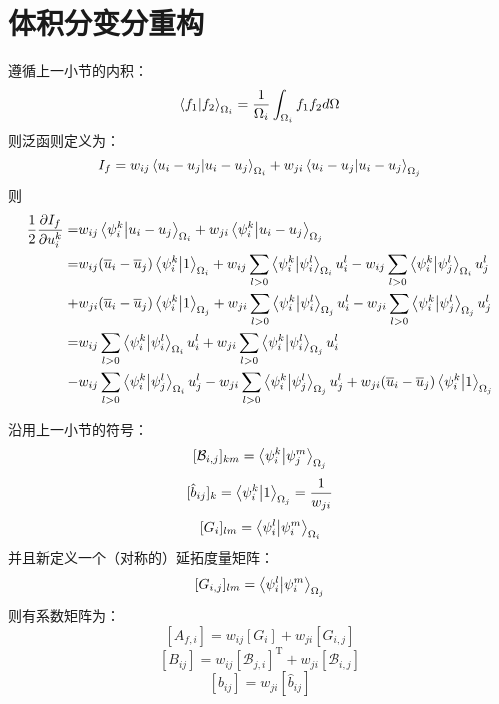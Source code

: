 \documentclass[UTF8,zihao=5]{ctexart} %
\newcommand{\trans}[0]{^\mathrm{T}}
\newcommand*{\mean}[1]{\overline{#1}}
\begin{document}
\section{体积分变分重构}

遵循上一小节的内积：
$$
    \innerproduct{f_1}{f_2}_{\Omega_i}=\frac{1}{\Omega_i}\int_{\Omega_i}{f_1f_2d\Omega}
$$
则泛函则定义为：
$$
    I_f=
    w_{ij}
    \innerproduct{u_i-u_j}{u_i-u_j}_{\Omega_i}
    +
    w_{ji}
    \innerproduct{u_i-u_j}{u_i-u_j}_{\Omega_j}
$$
则
$$
\begin{aligned}
    \frac{1}{2}\frac{\partial I_f}{\partial u_i^k}
    = &
    w_{ij}
    \innerproduct{\psi_i^k}{u_i-u_j}_{\Omega_i}
    +
    w_{ji}
    \innerproduct{\psi_i^k}{u_i-u_j}_{\Omega_j} 
    \\ = & 
    w_{ij}
    (\mean{u}_i-\mean{u}_j)\innerproduct{\psi_i^k}{1}_{\Omega_i}
    +
    w_{ij}
    \sum_{l>0}\innerproduct{\psi_i^k}{\psi_i^l}_{\Omega_i}u_i^l
    -
    w_{ij}
    \sum_{l>0}\innerproduct{\psi_i^k}{\psi_j^l}_{\Omega_i}u_j^l
    \\  + & 
    w_{ji}
    (\mean{u}_i-\mean{u}_j)\innerproduct{\psi_i^k}{1}_{\Omega_j}
    +
    w_{ji}
    \sum_{l>0}\innerproduct{\psi_i^k}{\psi_i^l}_{\Omega_j}u_i^l
    -
    w_{ji}
    \sum_{l>0}\innerproduct{\psi_i^k}{\psi_j^l}_{\Omega_j}u_j^l
    \\ = &
    w_{ij}
    \sum_{l>0}\innerproduct{\psi_i^k}{\psi_i^l}_{\Omega_i}u_i^l
    +
    w_{ji}
    \sum_{l>0}\innerproduct{\psi_i^k}{\psi_i^l}_{\Omega_j}u_i^l
    \\ 
    - &
    w_{ij}
    \sum_{l>0}\innerproduct{\psi_i^k}{\psi_j^l}_{\Omega_i}u_j^l
    -
    w_{ji}
    \sum_{l>0}\innerproduct{\psi_i^k}{\psi_j^l}_{\Omega_j}u_j^l
    + 
    w_{ji}
    (\mean{u}_i-\mean{u}_j)\innerproduct{\psi_i^k}{1}_{\Omega_j}
\end{aligned}
$$

沿用上一小节的符号：
$$
    [\mathcal{B}_{i,j}]_{km}=\innerproduct{\psi_i^k}{\psi_j^m}_{\Omega_j}
$$
$$
    [\hat{b}_{ij}]_{k} =
    \innerproduct{\psi_i^k}{1}_{\Omega_j}=\frac{1}{w_{ji}}
$$
$$
    [G_i]_{lm} = \innerproduct{\psi_i^l}{\psi_i^m}_{\Omega_i}
$$
并且新定义一个（对称的）延拓度量矩阵：
$$
    [G_{i,j}]_{lm} = \innerproduct{\psi_i^l}{\psi_i^m}_{\Omega_j}
$$
则有系数矩阵为：
$$
    [A_{f,i}] = w_{ij}[G_i] + w_{ji}[G_{i,j}]
$$
$$
    [B_{ij}] = w_{ij}[\mathcal{B}_{j,i}]\trans + w_{ji}[\mathcal{B}_{i,j}]
$$
$$
    [b_{ij}] = w_{ji}[\hat{b}_{ij}]
$$


{}

\end{document}
